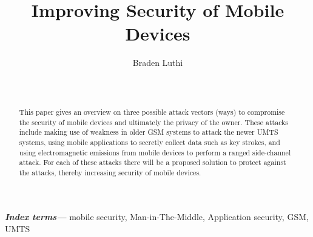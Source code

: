\documentclass{sig-alternate}
\providecommand{\keywords}[1]{\textbf{\textit{Index terms---}} #1}
\begin{document}

\title{Improving Security of Mobile Devices}


\author{
\alignauthor
Braden Luthi\\
	\\
	\\
}

\maketitle
\begin{abstract}
	This paper gives an overview on three possible attack vectors (ways) to compromise the security of mobile devices and ultimately the privacy of the owner. These attacks include making use of weakness in older GSM systems to attack the newer UMTS systems, using mobile applications to secretly collect data such as key strokes, and using electromagnetic emissions from mobile devices to perform a ranged side-channel attack. For each of these attacks there will be a proposed solution to protect against the attacks, thereby increasing security of mobile devices.
	
\end{abstract}
\keywords{mobile security, Man-in-The-Middle, Application security, GSM, UMTS}
\end{document}
